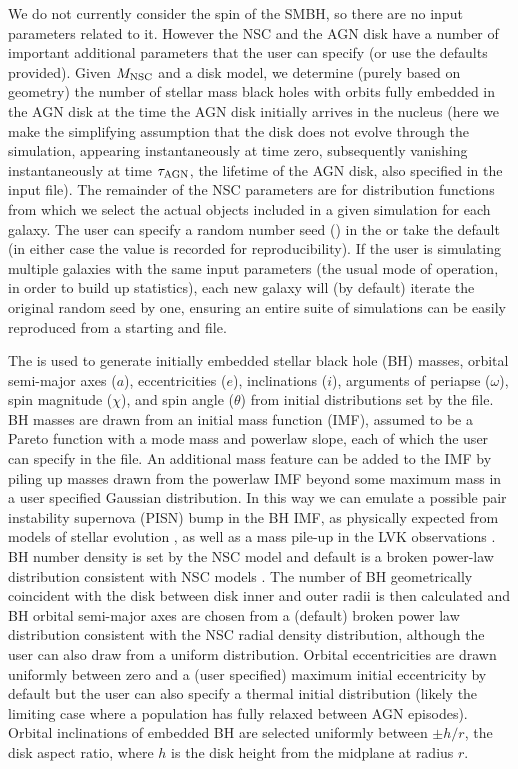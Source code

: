 We do not currently consider the spin of the SMBH, so there are no input parameters related to it.
However the NSC and the AGN disk have a number of important additional parameters that the user can specify (or use the defaults provided).
Given $M_{\rm NSC}$ and a disk model, we determine (purely based on geometry) the number of stellar mass black holes with orbits fully embedded in the AGN disk at the time the AGN disk initially arrives in the nucleus (here we make the simplifying assumption that the disk does not evolve through the simulation, appearing instantaneously at time zero, subsequently vanishing instantaneously at time $\tau_{\rm AGN}$, the lifetime of the AGN disk, also specified in the input file).
The remainder of the NSC parameters are for distribution functions from which we select the actual objects included in a given simulation for each galaxy.
The user can specify a random number seed () in the  or take the default (in either case the value is recorded for reproducibility).
If the user is simulating multiple galaxies with the same input parameters (the usual mode of operation, in order to build up statistics), each new galaxy will (by default) iterate the original random seed by one, ensuring an entire suite of simulations can be easily reproduced from a starting  and  file.

The  is used to generate initially embedded stellar black hole (BH) masses, orbital semi-major axes ($a$), eccentricities ($e$), inclinations ($i$), arguments of periapse ($\omega$), spin magnitude ($\chi$), and spin angle ($\theta$) from initial distributions set by the  file.
BH masses are drawn from an initial mass function (IMF), assumed to be a Pareto function with a mode mass and powerlaw slope, each of which the user can specify in the  file.
An additional mass feature can be added to the IMF by piling up masses drawn from the powerlaw IMF beyond some maximum mass in a user specified Gaussian distribution.
In this way we can emulate a possible pair instability supernova (PISN) bump in the BH IMF, as physically expected from models of stellar evolution \citep[e.g.][]{RenzoSmith24}, as well as a mass pile-up in the LVK observations \citep{Abbott+23-massbump}.
BH number density is set by the NSC model and default is a broken power-law distribution consistent with NSC models \citep{Generozov+18,NeumayerSethBoker20}.
The number of BH geometrically coincident with the disk between disk inner and outer radii is then calculated and BH orbital semi-major axes are chosen from a (default) broken power law distribution consistent with the NSC radial density distribution, although the user can also draw from a uniform distribution.
Orbital eccentricities are drawn uniformly between zero and a (user specified) maximum initial eccentricity by default but the user can also specify a thermal initial distribution (likely the limiting case where a population has fully relaxed between AGN episodes).
Orbital inclinations of embedded BH are selected uniformly between $\pm h/r$, the disk aspect ratio, where $h$ is the disk height from the midplane at radius $r$. 

